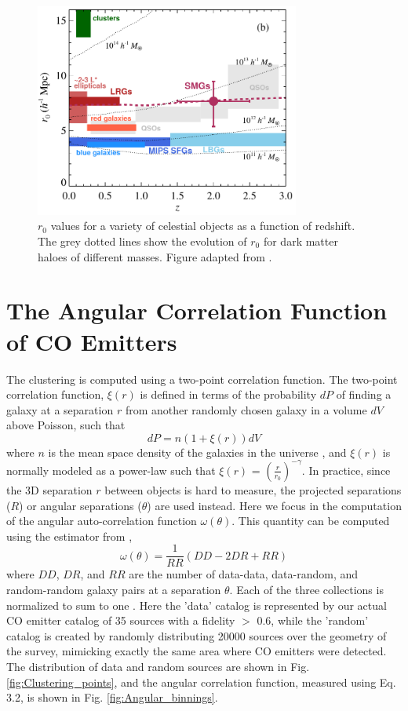 \begin{figure}[!htbp]
\centering \includegraphics[width=87mm]{clustering/Hickox2012_Compare.png}
\caption{$r_0$ values for a variety of celestial objects as a function of redshift. The grey dotted lines show the evolution of $r_0$ for dark matter haloes of different masses. Figure adapted from \cite{10.1111/j.1365-2966.2011.20303.x}.}
\label{fig:Hickox_compare}
\end{figure}

\section{The Angular Correlation Function of CO Emitters}

The clustering is computed using a two-point correlation function. The two-point correlation function, $ \xi(r)$ is defined in terms of the probability $dP$ of finding a galaxy at a separation $r$ from another randomly chosen galaxy in a volume $dV$ above Poisson, such that \begin{equation}
    dP = n(1 + \xi(r))dV
\end{equation} where $n$ is the mean space density of the galaxies in the universe \cite{hickox2011clustering}, and $\xi(r)$ is normally modeled as a power-law such that $\xi(r)$ = $(\frac{r}{r_0})^{-\gamma}$. In practice, since the 3D separation $r$ between objects is hard to measure, the projected separations ($R$) or angular separations ($\theta$) are used instead. Here we focus in the computation of the angular auto-correlation function $\omega(\theta)$. This quantity can be computed using the estimator from \cite{1993ApJ...412...64L}, 
\begin{equation}
   \omega(\theta) = \frac{1}{RR}(DD-2DR + RR) 
\end{equation}\label{eq:Function} where $DD$, $DR$, and $RR$ are the number of data-data, data-random, and random-random galaxy pairs at a separation $\theta$. Each of the three collections is normalized to sum to one \cite{hickox2011clustering}. Here the 'data' catalog is represented by our actual CO emitter catalog of 35 sources with a fidelity $>$ 0.6, while the 'random' catalog is created by randomly distributing 20000 sources over the geometry of the survey, mimicking exactly the same area where CO emitters were detected. The distribution of data and random sources are shown in Fig. \ref{fig:Clustering_points}, and the angular correlation function, measured using Eq. 3.2, is shown in Fig. \ref{fig:Angular_binnings}.

